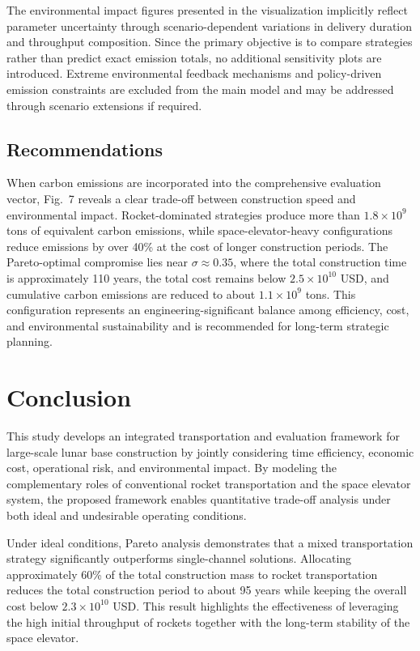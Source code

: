 \documentclass[12pt]{article}
\begin{document}
The environmental impact figures presented in the visualization implicitly reflect parameter uncertainty through scenario-dependent variations in delivery duration and throughput composition. Since the primary objective is to compare strategies rather than predict exact emission totals, no additional sensitivity plots are introduced. Extreme environmental feedback mechanisms and policy-driven emission constraints are excluded from the main model and may be addressed through scenario extensions if required.

\subsection{Recommendations}

When carbon emissions are incorporated into the comprehensive evaluation vector, Fig.~7 reveals a clear trade-off between construction speed and environmental impact. Rocket-dominated strategies produce more than $1.8 \times 10^{9}$ tons of equivalent carbon emissions, while space-elevator-heavy configurations reduce emissions by over 40\% at the cost of longer construction periods. The Pareto-optimal compromise lies near $\sigma \approx 0.35$, where the total construction time is approximately 110 years, the total cost remains below $2.5 \times 10^{10}$ USD, and cumulative carbon emissions are reduced to about $1.1 \times 10^{9}$ tons. This configuration represents an engineering-significant balance among efficiency, cost, and environmental sustainability and is recommended for long-term strategic planning.

\section{Conclusion}

This study develops an integrated transportation and evaluation framework for large-scale lunar base construction by jointly considering time efficiency, economic cost, operational risk, and environmental impact. By modeling the complementary roles of conventional rocket transportation and the space elevator system, the proposed framework enables quantitative trade-off analysis under both ideal and undesirable operating conditions.

Under ideal conditions, Pareto analysis demonstrates that a mixed transportation strategy significantly outperforms single-channel solutions. Allocating approximately 60\% of the total construction mass to rocket transportation reduces the total construction period to about 95 years while keeping the overall cost below $2.3 \times 10^{10}$ USD. This result highlights the effectiveness of leveraging the high initial throughput of rockets together with the long-term stability of the space elevator.
\end{document}
